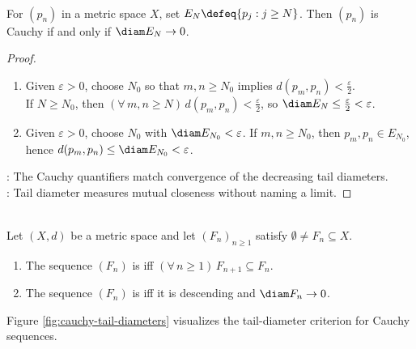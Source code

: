 \begin{proposition} \label{prop:cauchy-tail-diameters} \\
For $(p_n)$ in a metric space $X$, set $E_N\defeq\{p_j:j\geq N\}$. Then $(p_n)$ is Cauchy if and only if $\diam E_N\to0$.
\begin{proof}
\begin{enumerate}[label=\roman*.]
\setlength{\itemsep}{0pt}
\item[$(\Rightarrow)$] Given $\varepsilon>0$, choose $N_0$ so that $m,n\geq N_0$ implies $d(p_m,p_n)<\frac{\varepsilon}{2}$.\\
If $N\geq N_0$, then $(\forall\,m,n\geq N)\,d(p_m,p_n)<\frac{\varepsilon}{2}$, so $\diam E_N\leq\frac{\varepsilon}{2}<\varepsilon$.
\item[$(\Leftarrow)$] Given $\varepsilon>0$, choose $N_0$ with $\diam E_{N_0}<\varepsilon$. If $m,n\geq N_0$, then $p_m,p_n\in E_{N_0}$, hence $d(p_m,p_n)\leq\diam E_{N_0}<\varepsilon$.
\end{enumerate}
: The Cauchy quantifiers match convergence of the decreasing tail diameters.\\
: Tail diameter measures mutual closeness without naming a limit.
\end{proof}
\end{proposition}

\begin{definition} \label{def:contracting-sequence-of-metric-sets} \\
Let $(X,d)$ be a metric space and let $(F_n)_{n\geq1}$ satisfy $\emptyset\ne F_n\subseteq X$.
\begin{enumerate}[label=(\roman*)]
\setlength{\itemsep}{0pt}
\item The sequence $(F_n)$ is  iff $(\forall\,n\geq1)\,F_{n+1}\subseteq F_n$.
\item The sequence $(F_n)$ is  iff it is descending and $\diam F_n\to0$.
\end{enumerate}
\end{definition}

Figure \ref{fig:cauchy-tail-diameters} visualizes the tail-diameter criterion for Cauchy sequences.
\begin{illustrationfigure}[H]
  \centering
  
  \caption{Tail diameters $\diam E_N$ shrink toward $0$.}
  \label{fig:cauchy-tail-diameters}
\end{illustrationfigure}

